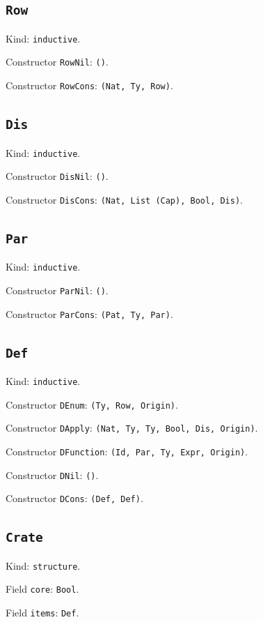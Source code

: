 \documentclass[11pt]{article}
\begin{document}
\subsection*{\texttt{Row}}
\noindent Kind: \texttt{inductive}.\par
\noindent Constructor \texttt{RowNil}: \texttt{()}.\par
\noindent Constructor \texttt{RowCons}: \texttt{(Nat, Ty, Row)}.\par
\subsection*{\texttt{Dis}}
\noindent Kind: \texttt{inductive}.\par
\noindent Constructor \texttt{DisNil}: \texttt{()}.\par
\noindent Constructor \texttt{DisCons}: \texttt{(Nat, List (Cap), Bool, Dis)}.\par
\subsection*{\texttt{Par}}
\noindent Kind: \texttt{inductive}.\par
\noindent Constructor \texttt{ParNil}: \texttt{()}.\par
\noindent Constructor \texttt{ParCons}: \texttt{(Pat, Ty, Par)}.\par
\subsection*{\texttt{Def}}
\noindent Kind: \texttt{inductive}.\par
\noindent Constructor \texttt{DEnum}: \texttt{(Ty, Row, Origin)}.\par
\noindent Constructor \texttt{DApply}: \texttt{(Nat, Ty, Ty, Bool, Dis, Origin)}.\par
\noindent Constructor \texttt{DFunction}: \texttt{(Id, Par, Ty, Expr, Origin)}.\par
\noindent Constructor \texttt{DNil}: \texttt{()}.\par
\noindent Constructor \texttt{DCons}: \texttt{(Def, Def)}.\par
\subsection*{\texttt{Crate}}
\noindent Kind: \texttt{structure}.\par
\noindent Field \texttt{core}: \texttt{Bool}.\par
\noindent Field \texttt{items}: \texttt{Def}.\par
\end{document}
